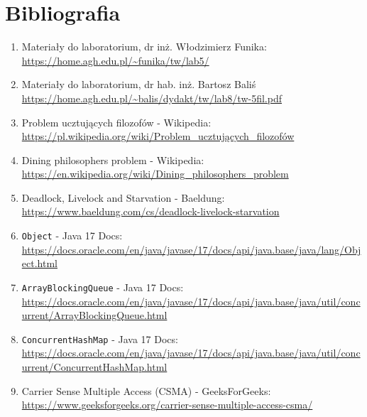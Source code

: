 \documentclass[11pt]{article}
\begin{document}
    \hypertarget{bibliografia}{%
\section{Bibliografia}\label{bibliografia}}

\begin{enumerate}
\def\labelenumi{\arabic{enumi}.}
\item
  Materiały do laboratorium, dr inż. Włodzimierz Funika:\\
  \url{https://home.agh.edu.pl/~funika/tw/lab5/}
\item
  Materiały do laboratorium, dr hab. inż. Bartosz Baliś\\
  \url{https://home.agh.edu.pl/~balis/dydakt/tw/lab8/tw-5fil.pdf}
\item
  Problem ucztujących filozofów - Wikipedia:\\
  \url{https://pl.wikipedia.org/wiki/Problem_ucztujących_filozofów}
\item
  Dining philosophers problem - Wikipedia:\\
  \url{https://en.wikipedia.org/wiki/Dining_philosophers_problem}
\item
  Deadlock, Livelock and Starvation - Baeldung:\\
  \url{https://www.baeldung.com/cs/deadlock-livelock-starvation}
\item
  \texttt{Object} - Java 17 Docs:\\
  \url{https://docs.oracle.com/en/java/javase/17/docs/api/java.base/java/lang/Object.html}
\item
  \texttt{ArrayBlockingQueue} - Java 17 Docs:\\
  \url{https://docs.oracle.com/en/java/javase/17/docs/api/java.base/java/util/concurrent/ArrayBlockingQueue.html}
\item
  \texttt{ConcurrentHashMap} - Java 17 Docs:\\
  \url{https://docs.oracle.com/en/java/javase/17/docs/api/java.base/java/util/concurrent/ConcurrentHashMap.html}
\item
  Carrier Sense Multiple Access (CSMA) - GeeksForGeeks:\\
  \url{https://www.geeksforgeeks.org/carrier-sense-multiple-access-csma/}
\end{enumerate}


    
    
    
\end{document}
